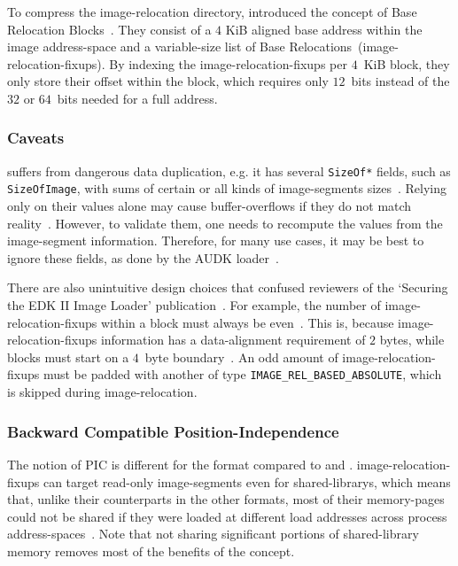To compress the \gls{image-relocation} directory,  introduced the concept of Base Relocation Blocks~\cite{pe-format}. They consist of a $4$ KiB aligned base address within the \gls{image} \gls{address-space} and a variable-size list of Base Relocations~(\glspl{image-relocation-fixup}). By indexing the \glspl{image-relocation-fixup} per $4$~KiB block, they only store their offset within the block, which requires only $12$~bits instead of the $32$ or $64$~bits needed for a full address.

\subsubsection{Caveats}

 suffers from dangerous data duplication, e.g. it has several \lstinline|SizeOf*| fields, such as \lstinline|SizeOfImage|, with sums of certain or all  kinds of \glspl{image-segment} sizes~\cite{pe-format}. Relying only on their values alone may cause \glspl{buffer-overflow} if they do not match reality~\cite{secure-pe}. However, to validate them, one needs to recompute the values from the \gls{image-segment} information. Therefore, for many use cases, it may be best to ignore these fields, as done by the \gls{AUDK}  loader~\cite{audk}.

There are also unintuitive design choices that confused reviewers of the `Securing the EDK II Image Loader' publication~\cite{secure-pe}. For example, the number of \glspl{image-relocation-fixup} within a block must always be even~\cite{secure-pe}. This is, because \glspl{image-relocation-fixup} information has a \gls{data-alignment} requirement of $2$ \glspl{byte}, while blocks must start on a $4$~\gls{byte} boundary~\cite{pe-format}. An odd amount of \glspl{image-relocation-fixup} must be padded with another of type \lstinline|IMAGE_REL_BASED_ABSOLUTE|, which is skipped during \gls{image-relocation}.

\subsubsection{Backward Compatible Position-Independence}

The notion of \gls{PIC} is different for the  format compared to  and . \Glspl{image-relocation-fixup} can target read-only \glspl{image-segment} even for  \glspl{shared-library}, which means that, unlike their counterparts in the other formats, most of their \glspl{memory-page} could not be shared if they were loaded at different load addresses across process \glspl{address-space}~\cite{ms-aslr}. Note that not sharing significant portions of \gls{shared-library} memory removes most of the benefits of the concept.

